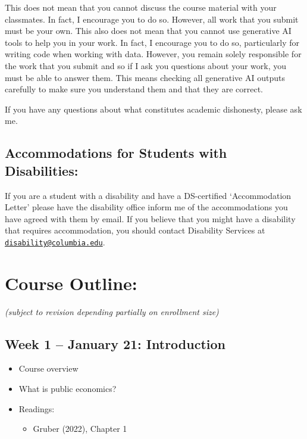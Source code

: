 \documentclass[11pt]{article}
\begin{document}
This does not mean that you cannot discuss the course material with your classmates. In fact, I encourage you to do so. However, all work that you submit must be your own. This also does not mean that you cannot use generative AI tools to help you in your work. In fact, I encourage you to do so, particularly for writing code when working with data. However, you remain solely responsible for the work that you submit and so if I ask you questions about your work, you must be able to answer them. This means checking all generative AI outputs carefully to make sure you understand them and that they are correct. 

If you have any questions about what constitutes academic dishonesty, please ask me. 

\subsection*{Accommodations for Students with Disabilities:}
If you are a student with a disability and have a DS-certified `Accommodation Letter' please have the disability office inform me of the accommodations you have agreed with them by email. If you believe that you might have a disability that requires accommodation, you should contact Disability Services at \href{mailto:disability@columbia.edu}{\nolinkurl{disability@columbia.edu}}.

\newpage

\section*{Course Outline:}
\textit{(subject to revision depending partially on enrollment size)}

\subsection*{Week 1 -- January 21: Introduction}
\begin{itemize}
    \setlength{\itemsep}{0em}
    \item Course overview
    \item What is public economics?
    \item Readings:
    \begin{itemize}
        \item Gruber (2022), Chapter 1
    \end{itemize}
\end{itemize}
\end{document}

